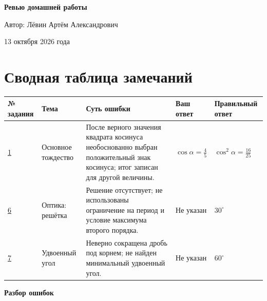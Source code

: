 \documentclass[12pt,a4paper]{article}
\begin{document}
\begin{titlepage}
\centering
\vspace*{\fill}
{\Huge\bfseries Ревью домашней работы\par}
\vspace{1.5cm}
{\Large Автор: Лёвин Артём Александрович\par}
\vspace{0.7cm}
{\large 13 октября 2026 года\par}
\vspace*{\fill}
\vspace{1.0cm}
\end{titlepage}

\section*{Сводная таблица замечаний}
\footnotesize
\renewcommand{\arraystretch}{1.5}
\begin{longtable}{@{}>{\centering\arraybackslash}p{1.45cm}>{\raggedright\arraybackslash}p{2.45cm}>{\raggedright\arraybackslash}p{4.6cm}>{\raggedright\arraybackslash}p{2.2cm}>{\raggedright\arraybackslash}p{2.5cm}@{}}
\toprule
\textbf{№ задания} & \textbf{Тема} & \textbf{Суть ошибки} & \textbf{Ваш ответ} & \textbf{Правильный ответ}\\
\midrule
\endhead
\hyperref[task:1]{1} & Основное тождество & После верного значения квадрата косинуса необоснованно выбран положительный знак косинуса; итог записан для другой величины. & $\cos\alpha=\frac45$ & $\cos^2\alpha=\frac{16}{25}$\\
\hyperref[task:6]{6} & Оптика: решётка & Решение отсутствует; не использованы ограничение на период и условие максимума второго порядка. & Не указан & $30^\circ$\\
\hyperref[task:7]{7} & Удвоенный угол & Неверно сокращена дробь под корнем; не найден минимальный удвоенный угол. & Не указан & $60^\circ$\\
\bottomrule
\end{longtable}
\normalsize
\renewcommand{\arraystretch}{1}

\clearpage
\vspace*{\fill}
\begin{center}{\LARGE\bfseries Разбор ошибок}\end{center}
\vspace*{\fill}
\clearpage
\end{document}

